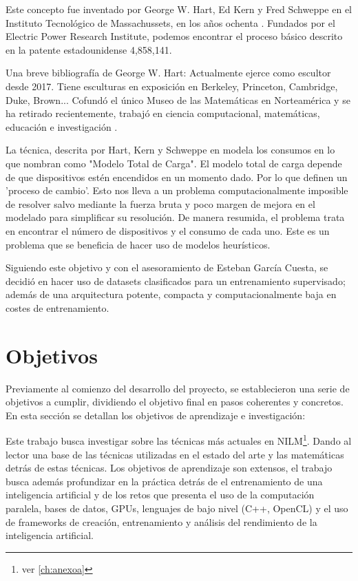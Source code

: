Este concepto fue inventado por George W. Hart, Ed Kern y Fred Schweppe en el Instituto Tecnológico de Massachussets, en los años ochenta \autocite{192069}. Fundados por el Electric Power Research Institute, podemos encontrar el proceso básico descrito en la patente estadounidense 4,858,141.

Una breve bibliografía de George W. Hart: Actualmente ejerce como escultor desde 2017. Tiene esculturas en exposición en Berkeley, Princeton, Cambridge, Duke, Brown... Cofundó el único Museo de las Matemáticas en Norteamérica y se ha retirado recientemente, trabajó en ciencia computacional, matemáticas, educación e investigación \autocite{HartBibliography}.

La técnica, descrita por Hart, Kern y Schweppe en \autocite{192069} modela los consumos en lo que nombran como "Modelo Total de Carga". El modelo total de carga depende de que dispositivos estén encendidos en un momento dado. Por lo que definen un 'proceso de cambio'.
Esto nos lleva a un problema computacionalmente imposible de resolver salvo mediante la fuerza bruta\autocite[4]{192069} y poco margen de mejora en el modelado para simplificar su resolución. De manera resumida, el problema trata en encontrar el número de dispositivos y el consumo de cada uno. 
Este es un problema que se beneficia de hacer uso de modelos heurísticos.

Siguiendo este objetivo y con el asesoramiento de Esteban García Cuesta, se decidió en hacer uso de datasets clasificados para un entrenamiento supervisado; además de una arquitectura potente, compacta y computacionalmente baja en costes de entrenamiento. 




\section{Objetivos}
\label{sec:objetivos}
Previamente al comienzo del desarrollo del proyecto, se establecieron una serie de objetivos a cumplir, dividiendo el objetivo final en pasos coherentes y concretos.
En esta sección se detallan los objetivos de aprendizaje e investigación:

Este trabajo busca investigar sobre las técnicas más actuales en NILM\footnote{ver \autoref{ch:anexoa}}. Dando al lector una base de las técnicas utilizadas en el estado del arte y las matemáticas detrás de estas técnicas.
Los objetivos de aprendizaje son extensos, el trabajo busca además profundizar en la práctica detrás de el entrenamiento de una inteligencia artificial y de los retos que presenta el uso de la computación paralela, bases de datos, GPUs, lenguajes de bajo nivel (C++, OpenCL) y el uso de frameworks de creación, entrenamiento y análisis del rendimiento de la inteligencia artificial.


